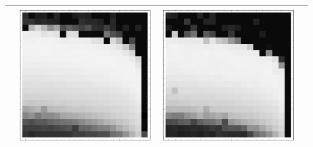 \documentclass[10pt]{article}
\begin{document}
\begin{tabular}{|c|c|c|c|}
        & \includegraphics[scale=0.25]{plots/simple/LF-40B10B-20T10-MNIST-6.png}
        & \includegraphics[scale=0.25]{plots/simple/LF-40B20B10B-20T10-MNIST-6.png} \\ \hline
\end{tabular}
\end{document}
